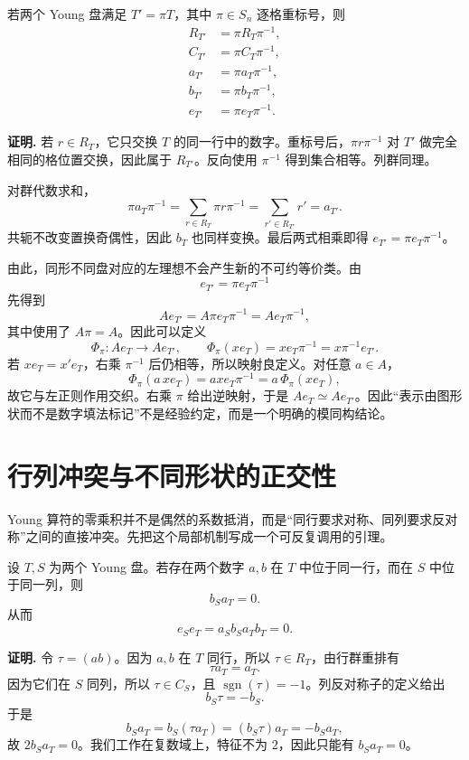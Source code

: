 \begin{lemma}[行群与列群随重标号共轭]
若两个 Young 盘满足 $T'=\pi T$，其中 $\pi\in S_n$ 逐格重标号，则
\begin{align}
R_{T'}&=\pi R_T\pi^{-1},\\
C_{T'}&=\pi C_T\pi^{-1},\\
a_{T'}&=\pi a_T\pi^{-1},\\
b_{T'}&=\pi b_T\pi^{-1},\\
e_{T'}&=\pi e_T\pi^{-1}.
\label{eq:young-conjugation-all}
\end{align}

\par\smallskip\noindent\textbf{证明.}
若 $r\in R_T$，它只交换 $T$ 的同一行中的数字。重标号后，$\pi r\pi^{-1}$ 对 $T'$ 做完全相同的格位置交换，因此属于 $R_{T'}$。反向使用 $\pi^{-1}$ 得到集合相等。列群同理。

对群代数求和，
\[
\pi a_T\pi^{-1}
=\sum_{r\in R_T}\pi r\pi^{-1}
=\sum_{r'\in R_{T'}}r'=a_{T'}.
\]
共轭不改变置换奇偶性，因此 $b_T$ 也同样变换。最后两式相乘即得 $e_{T'}=\pi e_T\pi^{-1}$。
\end{lemma}

由此，同形不同盘对应的左理想不会产生新的不可约等价类。由
\[
e_{T'}=\pi e_T\pi^{-1}
\]
先得到
\[
Ae_{T'}=A\pi e_T\pi^{-1}=Ae_T\pi^{-1},
\]
其中使用了 $A\pi=A$。因此可以定义
\[
\Phi_\pi:Ae_T\to Ae_{T'},
\qquad
\Phi_\pi(xe_T)=xe_T\pi^{-1}=x\pi^{-1}e_{T'}.
\]
若 $xe_T=x'e_T$，右乘 $\pi^{-1}$ 后仍相等，所以映射良定义。对任意 $a\in A$，
\[
\Phi_\pi(a\,xe_T)=axe_T\pi^{-1}=a\,\Phi_\pi(xe_T),
\]
故它与左正则作用交织。右乘 $\pi$ 给出逆映射，于是 $Ae_T\simeq Ae_{T'}$。因此“表示由图形状而不是数字填法标记”不是经验约定，而是一个明确的模同构结论。

\section{行列冲突与不同形状的正交性}

Young 算符的零乘积并不是偶然的系数抵消，而是“同行要求对称、同列要求反对称”之间的直接冲突。先把这个局部机制写成一个可反复调用的引理。

\begin{lemma}[行列冲突引理]
设 $T,S$ 为两个 Young 盘。若存在两个数字 $a,b$ 在 $T$ 中位于同一行，而在 $S$ 中位于同一列，则
\begin{equation}
b_Sa_T=0.
\label{eq:row-column-collision}
\end{equation}
从而
\[
e_Se_T=a_Sb_Sa_Tb_T=0.
\]

\par\smallskip\noindent\textbf{证明.}
令 $\tau=(ab)$。因为 $a,b$ 在 $T$ 同行，所以 $\tau\in R_T$，由行群重排有
\[
\tau a_T=a_T.
\]
因为它们在 $S$ 同列，所以 $\tau\in C_S$，且 $\operatorname{sgn}(\tau)=-1$。列反对称子的定义给出
\[
b_S\tau=-b_S.
\]
于是
\[
b_Sa_T=b_S(\tau a_T)=(b_S\tau)a_T=-b_Sa_T,
\]
故 $2b_Sa_T=0$。我们工作在复数域上，特征不为 $2$，因此只能有 $b_Sa_T=0$。
\end{lemma}

